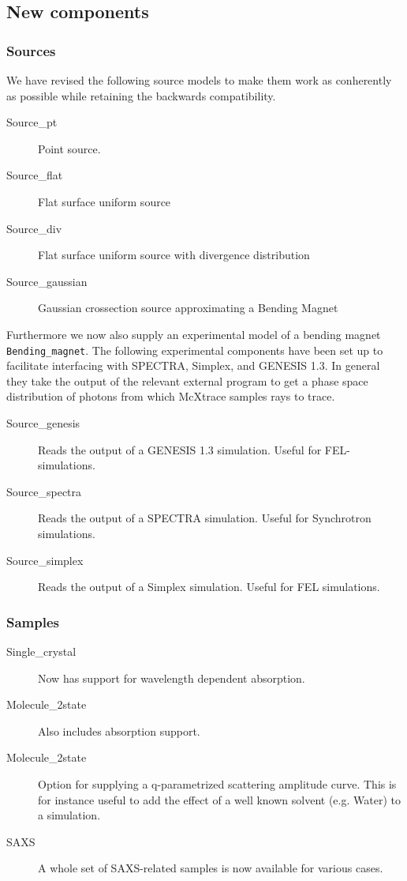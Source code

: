 \subsection{New components}

\subsubsection*{Sources}
We have revised the following source models to make them work as conherently as possible while retaining the backwards compatibility.
\begin{description}
\item[Source\_pt] Point source.
\item[Source\_flat] Flat surface uniform source
\item[Source\_div] Flat surface uniform source with divergence distribution
\item[Source\_gaussian] Gaussian crossection source approximating a Bending Magnet
\end{description}
Furthermore we now also supply an experimental model of a bending magnet \texttt{Bending\_magnet}.
The following experimental components have been set up to facilitate interfacing with SPECTRA, Simplex, and GENESIS 1.3.
In general they take the output of the relevant external program to get a phase space distribution of photons from which McXtrace samples rays
to trace.
\begin{description}
  \item[Source\_genesis] Reads the output of a GENESIS 1.3 simulation. Useful for FEL-simulations. 
  \item[Source\_spectra] Reads the output of a SPECTRA simulation. Useful for Synchrotron simulations.
  \item[Source\_simplex] Reads the output of a Simplex simulation. Useful for FEL simulations.
\end{description}

\subsubsection*{Samples}
\begin{description}
  \item [Single\_crystal] Now has support for wavelength dependent absorption.
  \item [Molecule\_2state] Also includes absorption support.
  \item [Molecule\_2state] Option for supplying a q-parametrized scattering amplitude curve. This is for instance useful to add the effect of a well known solvent (e.g. Water) to a simulation.
  \item [SAXS] A whole set of SAXS-related samples is now available for various cases.
\end{description} 

